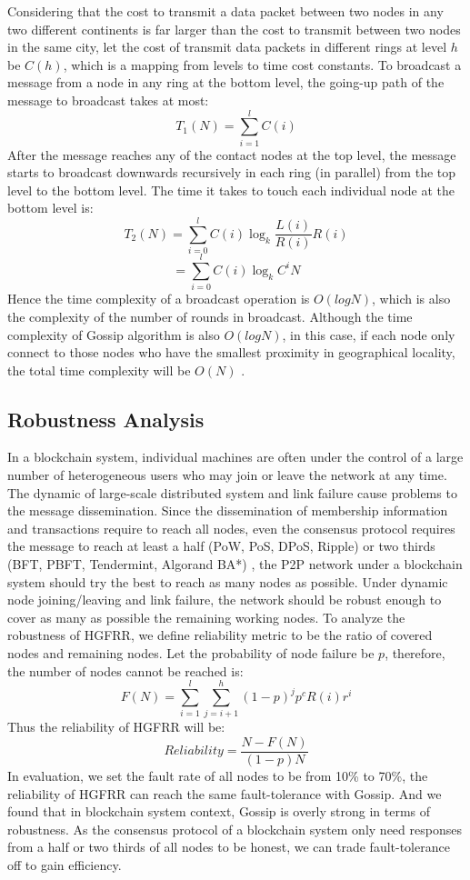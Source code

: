 Considering that the cost to transmit a data packet between two nodes in any two different continents is far larger than the cost to transmit between two nodes in the same city, let the cost of transmit data packets in different rings at level $h$ be $C(h)$, which is a mapping from levels to time cost constants. 
To broadcast a message from a node in any ring at the bottom level, the going-up path of the message to broadcast takes at most: $$T_1(N) = \sum_{i=1}^{l}C(i)$$
After the message reaches any of the contact nodes at the top level, the message starts to broadcast downwards recursively in each ring (in parallel) from the top level to the bottom level. The time it takes to touch each individual node at the bottom level is: $$T_2(N) = \sum_{i=0}^{l}C(i)\log_{k}{\frac{L(i)}{R(i)}}R(i)$$ $$= \sum_{i=0}^{l}C(i)\log_{k}{C^iN}$$
Hence the time complexity of a broadcast operation is $O(logN)$, which is also the complexity of the number of rounds in broadcast. Although the time complexity of Gossip algorithm is also $O(logN)$, in this case, if each node only connect to those nodes who have the smallest proximity in geographical locality, the total time complexity will be $O(N)$ \cite{kashyap2006efficient, kaune2008embracing}.

\subsection{Robustness Analysis}

In a blockchain system, individual machines are often under the control of a large number of heterogeneous users who may join or leave the network at any time. The dynamic of large-scale distributed system and link failure cause problems to the message dissemination. Since the dissemination of membership information and transactions require to reach all nodes, even the consensus protocol requires the message to reach at least a half (PoW, PoS, DPoS, Ripple) or two thirds (BFT, PBFT, Tendermint, Algorand BA*) \cite{zheng2016blockchain}, the P2P network under a blockchain system should try the best to reach as many nodes as possible. Under dynamic node joining/leaving and link failure, the network should be robust enough to cover as many as possible the remaining working nodes.
To analyze the robustness of HGFRR, we define reliability metric to be the ratio of covered nodes and remaining nodes. Let the probability of node failure be $p$, therefore, the number of nodes cannot be reached is: $$F(N)=\sum_{i=1}^{l} \sum_{j=i+1}^{h}(1-p)^jp^cR(i)r^{i}$$
Thus the reliability of HGFRR will be: $$Reliability = \frac{N-F(N)}{(1-p)N}$$
In evaluation, we set the fault rate of all nodes to be from 10\% to 70\%, the reliability of HGFRR can reach the same fault-tolerance with Gossip. And we found that in blockchain system context, Gossip is overly strong in terms of robustness. As the consensus protocol of a blockchain system only need responses from a half or two thirds of all nodes to be honest, we can trade fault-tolerance off to gain efficiency.